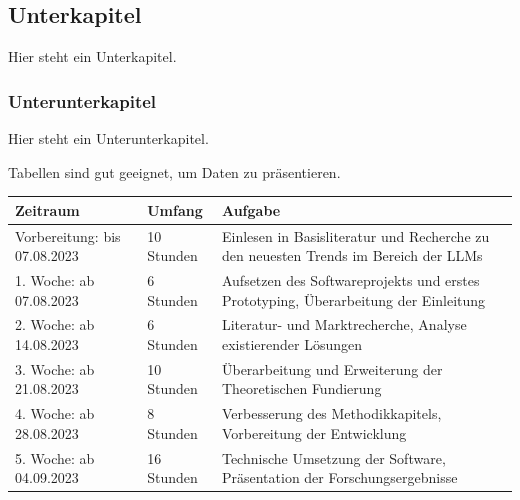 \documentclass[11pt]{article}
\begin{document}
\subsection{Unterkapitel}
\label{subsec:unterkapitel}

Hier steht ein Unterkapitel.

\subsubsection{Unterunterkapitel}
\label{subsubsec:unterunterkapitel}

Hier steht ein Unterunterkapitel.

Tabellen sind gut geeignet, um Daten zu präsentieren.

\begin{tabularx}{\columnwidth}{p{2.75cm}lX}
  \textbf{Zeitraum}                     & \textbf{Umfang} & \textbf{Aufgabe}                                                                    \\ \toprule

  Vorbereitung: \newline bis 07.08.2023 & 10 Stunden      & Einlesen in Basisliteratur und Recherche zu den neuesten Trends im Bereich der LLMs \\ \midrule

  1. Woche:     \newline ab 07.08.2023  & 6 Stunden       & Aufsetzen des Softwareprojekts und erstes Prototyping, Überarbeitung der Einleitung \\ \midrule

  2. Woche:     \newline ab 14.08.2023  & 6 Stunden       & Literatur- und Marktrecherche, Analyse existierender Lösungen                       \\ \midrule

  3. Woche:     \newline ab 21.08.2023  & 10 Stunden      & Überarbeitung und Erweiterung der Theoretischen Fundierung                          \\ \midrule

  4. Woche:     \newline ab 28.08.2023  & 8 Stunden       & Verbesserung des Methodikkapitels, Vorbereitung der Entwicklung                     \\ \midrule

  5. Woche:     \newline ab 04.09.2023  & 16 Stunden      & Technische Umsetzung der Software, Präsentation der Forschungsergebnisse            \\ \midrule


\end{tabularx}
\end{document}
